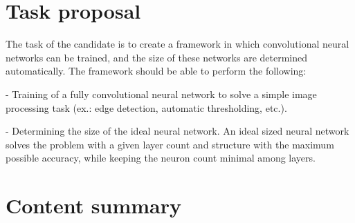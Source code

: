 \documentclass[12pt]{report}
\begin{document}
\tableofcontents


\chapter*{Task proposal}

The task of the candidate is to create a framework in which convolutional neural networks can be trained, and the size of these networks are determined automatically. The framework should be able to perform the following:\par
- Training of a fully convolutional neural network to solve a simple image processing task (ex.: edge detection, automatic thresholding, etc.).\par
- Determining the size of the ideal neural network. An ideal sized neural network solves the problem with a given layer count and structure with the maximum possible accuracy, while keeping the neuron count minimal among layers.
\chapter*{Content summary}
\end{document}
